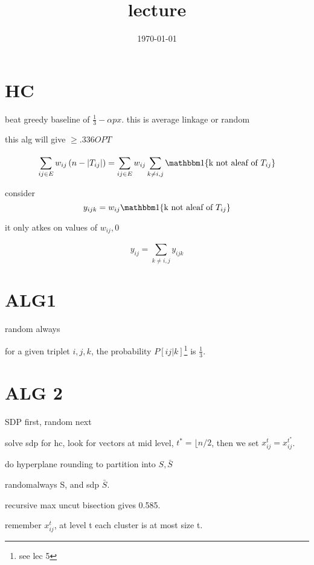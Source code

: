 \documentclass{article}
\title{lecture}
\date{\today}
\theoremstyle{definition}
\newcommand{\abs}[1]{\left| #1 \right|}
\begin{document}
\maketitle


\section{HC}

beat greedy baseline of \(\frac{1}{3}-\alpha px\). this is average linkage or random

this alg will give \(\geq .336 OPT\)

\begin{equation}
    \sum_{ij\in E}^{}w_{ij}\left( n-\abs{T_{ij}} \right)=\sum_{ij\in E}^{}w_{ij}\sum_{k\neq i,j}^{}\mathbbm 1 \{\text{k not  aleaf of $T_{ij}$}\}
\end{equation}


consider
\begin{equation}
    y_{ijk} = w_{ij}\mathbbm 1 \{\text{k not  aleaf of $T_{ij}$}\}
\end{equation}

it only atkes on values of \(w_{ij},0\)


\begin{equation}\label{6.1}
    y_{ij} = \sum_{k\neq i,j}^{}y_{ijk}
\end{equation}

\section{ALG1}
random always

for a given triplet \(i,j,k\), the probability \(P[ij\vert k]\)\footnote{see lec 5} is \(\frac{1}{3}\). 

\section{ALG 2}
SDP first, random next


solve sdp for hc, look for vectors at mid level, \(t^*=\lfloor{n/2}\), then we set \(x^t_{ij} = x^{t^*}_{ij}\).


do hyperplane rounding to partition into \(S,\bar{S}\)



randomalways S, and sdp \(\bar{S}\).


recursive max uncut bisection gives 0.585.


remember \(x^t_{ij}\), at level t each cluster is at most size t. 
\end{document}
